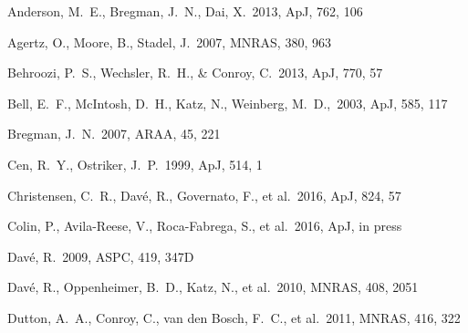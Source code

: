 \documentclass[useAMS,usenatbib]{mn2e}
\def \apj {ApJ}
\def \mnras {MNRAS}
\begin{document}
\begin{thebibliography}{}


 Anderson, M.~E., Bregman, J.~N., Dai, X.\ 2013, \apj, 762, 106

 Agertz, O., Moore, B., Stadel, J.\ 2007, \mnras, 380, 963


 Behroozi, P.~S.,
  Wechsler, R.~H., \& Conroy, C.\ 2013, \apj, 770, 57

 Bell, E.~F., McIntosh, D.~H., Katz, N., Weinberg, M.~D.,\ 2003, \apj, 585, 117

Bregman, J.~N.\ 2007, ARAA, 45, 221


Cen, R.~Y., Ostriker, J.~P.\ 1999, \apj, 514, 1

Christensen, C.~R., Dav{\'e}, R., Governato, F., et al.\ 2016, \apj, 824, 57

Colin, P., Avila-Reese, V., Roca-Fabrega, S., et al.\ 2016, \apj, in press


 Dav{\'e}, R.\ 2009, ASPC, 419, 347D

 Dav{\'e}, R., Oppenheimer, B.~D., Katz, N., et al.\ 2010, \mnras, 408, 2051

 Dutton, A.~A., Conroy, 
  C., van den Bosch, F.~C., et al.\ 2011, \mnras, 416, 322
  

\end{thebibliography}
\end{document}
